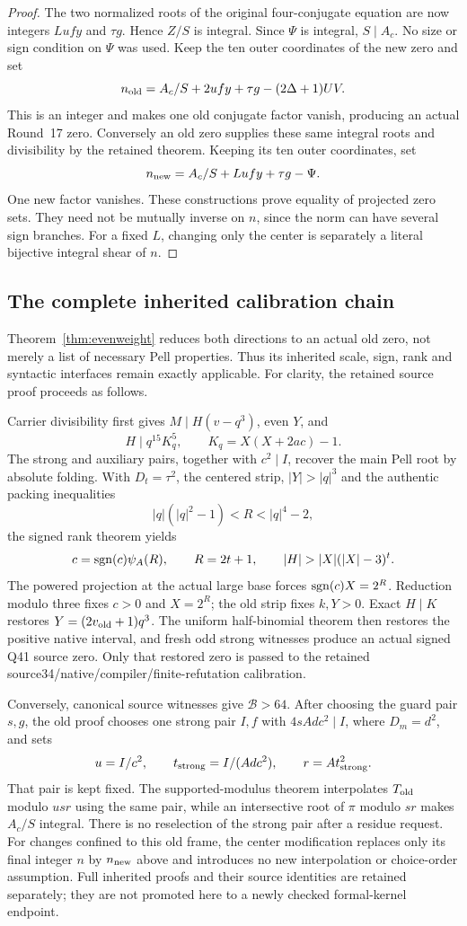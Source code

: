 \begin{proof}
The two normalized roots of the original four-conjugate equation are now
integers $Lufy$ and $\tau g$. Hence $Z/S$ is integral. Since $\Psi$
is integral, $S\mid A_c$. No size or sign condition on $\Psi$ was used.
Keep the ten outer coordinates of the new zero and set
\[
 n_{\rm old}=A_c/S+2ufy+\tau g-(2\Delta+1)UV.
\]
This is an integer and makes one old conjugate factor vanish, producing an
actual Round~17 zero. Conversely an old zero supplies these same integral
roots and divisibility by the retained theorem. Keeping its ten outer
coordinates, set
\[
 n_{\rm new}=A_c/S+Lufy+\tau g-\Psi.
\]
One new factor vanishes. These constructions prove equality of projected
zero sets. They need not be mutually inverse on $n$, since the norm can
have several sign branches. For a fixed $L$, changing only the center is
separately a literal bijective integral shear of $n$.
\end{proof}

\subsection{The complete inherited calibration chain}
Theorem~\ref{thm:evenweight} reduces both directions to an actual old
zero, not merely a list of necessary Pell properties. Thus its inherited
scale, sign, rank and syntactic interfaces remain exactly applicable.
For clarity, the retained source proof proceeds as follows.

Carrier divisibility first gives $M\mid H(v-q^3)$, even $Y$, and
\[
 H\mid q^{15}K_q^5,\qquad K_q=X(X+2ac)-1.
\]
The strong and auxiliary pairs, together with $c^2\mid I$, recover the
main Pell root by absolute folding. With $D_t=\tau^2$, the centered
strip, $|Y|>|q|^3$ and the authentic packing inequalities
\[
 |q|(|q|^2-1)<R<|q|^4-2,
\]
the signed rank theorem yields
\[
 c=\sgn(c)\psi_A(R),\qquad R=2t+1,
 \qquad |H|>|X|(|X|-3)^t.
\]
The powered projection at the actual large base forces
$\operatorname{sgn}(c)X=2^R$. Reduction modulo three fixes $c>0$ and $X=2^R$;
the old strip fixes $k,Y>0$. Exact $H\mid K$ restores
$Y=(2v_{\rm old}+1)q^3$. The uniform half-binomial theorem then restores
the positive native interval, and fresh odd strong witnesses produce an
actual signed Q41 source zero. Only that restored zero is passed to the
retained source34/native/compiler/finite-refutation calibration.

Conversely, canonical source witnesses give $\mathcal B>64$.
After choosing the guard pair $s,g$, the old proof chooses one strong
pair $I,f$ with $4sAdc^2\mid I$, where $D_m=d^2$, and sets
\[
 u=I/c^2,\qquad t_{\rm strong}=I/(Adc^2),\qquad
 r=At_{\rm strong}^2.
\]
That pair is kept fixed. The supported-modulus theorem interpolates
$T_{\rm old}$ modulo $usr$ using the same pair, while an intersective
root of $\pi$ modulo $sr$ makes $A_c/S$ integral. There is no reselection
of the strong pair after a residue request. For changes confined to this old frame, the center modification replaces
only its final integer $n$ by $n_{\rm new}$ above and introduces no new
interpolation or choice-order assumption. Full inherited proofs and their
source identities are retained separately; they are not promoted here to
a newly checked formal-kernel endpoint.


